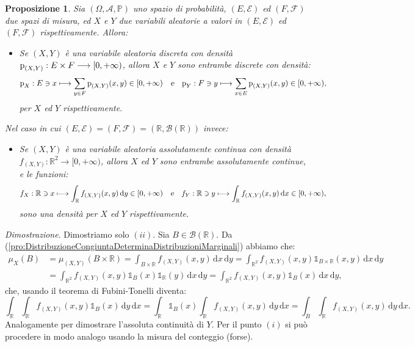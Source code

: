 \documentclass[11pt]{book}
\makeatletter
\theoremstyle{Definizione}
\theoremstyle{TeoremaProposizioneLemmaCorollario}
\newtheorem{mypropo}[myteo]{Proposizione}
\theoremstyle{OsservazioneNota}
\renewenvironment{proof}[1][\proofname]{\par
  \normalfont \topsep6\p@\@plus6\p@\relax
  \trivlist
  \item[\hskip\labelsep
        \itshape
    #1\@addpunct{.}]\ignorespaces
}{%
  \endtrivlist\@endpefalse
}
\newcommand{\R}{\mathbb{R}}
\renewcommand{\P}{\mathbb{P}}
\renewcommand{\d}{\mathrm{d}}
\newcommand{\dx}{\,\d x}
\newcommand{\dy}{\,\d y}
\newcommand{\p}{\textup{p}}
\newcommand{\uno}[1]{\mathds{1}_{#1}}
\renewenvironment{proof}{\textsl{Dimostrazione}.}{}
\makeatother
\begin{document}
\begin{boxpro}
\begin{mypropo}\label{pro:DistribuzioneCongiuntaAssContODiscrAlloraDistribuzioniMarginaliAssContODiscr}
Sia $(\Omega,\mathcal{A},\P)$ uno spazio di probabilità, $(E,\mathcal{E})$ ed $(F,\mathcal{F})$ due spazi di misura, ed $X$ e $Y$ due variabili aleatorie a valori in $(E,\mathcal{E})$ ed $(F,\mathcal{F})$ rispettivamente. Allora:
\begin{itemize}
\item[$(i)$] Se $(X,Y)$ è una variabile aleatoria discreta con densità $\p_{(X,Y)}:E\times F \longrightarrow [0,+\infty)$, allora $X$ e $Y$ sono entrambe discrete con densità:
$$
\p_X:E \ni x \longmapsto \sum_{y\in F} \p_{(X,Y)}(x,y)\in [0,+\infty)\quad \textsl{e}\quad \p_Y:F\ni y \longmapsto \sum_{x\in E} \p_{(X,Y)}(x,y)\in [0,+\infty),
$$
per $X$ ed $Y$ rispettivamente.
\end{itemize}
Nel caso in cui $(E,\mathcal{E}) = (F,\mathcal{F}) = (\R,\mathcal{B}(\R))$ invece:
\begin{itemize}
\item[$(ii)$] Se $(X,Y)$ è una variabile aleatoria assolutamente continua con densità $f_{(X,Y)}:\R^2 \longrightarrow [0,+\infty)$, allora $X$ ed $Y$ sono entrambe assolutamente continue, e le funzioni:
$$
f_X:\R\ni x \longmapsto \int_\R f_{(X,Y)}(x,y)\dy\in [0,+\infty)\quad \textsl{e}\quad f_Y:\R\ni y \longmapsto \int_\R f_{(X,Y)} (x,y)\dx \in [0,+\infty),
$$
sono una densità per $X$ ed $Y$ rispettivamente.
\end{itemize}
\end{mypropo}
\tcblower
\begin{proof}
Dimostriamo solo $(ii)$. Sia $B\in \mathcal{B}(\R)$. Da (\ref{pro:DistribuzioneCongiuntaDeterminaDistribuzioniMarginali}) abbiamo che:
\begin{align*}
\mu_X(B) &= \mu_{(X,Y)}(B\times \R) = \int_{B\times \R}f_{(X,Y)}(x,y)\dx\dy = \int_{\R^2} f_{(X,Y)}(x,y)\uno{B\times \R}(x,y) \dx\dy \\
&= \int_{\R^2} f_{(X,Y)}(x,y) \uno{B}(x)\uno{\R}(y) \dx\dy = \int_{\R^2} f_{(X,Y)}(x,y)\uno{B}(x)\dx\dy,
\end{align*}
che, usando il teorema di Fubini-Tonelli diventa:
$$
\int_\R\int_\R f_{(X,Y)}(x,y)\uno{B}(x)\dy\dx = \int_\R \uno{B}(x)\int_\R f_{(X,Y)}(x,y)\dy\dx = \int_B \int_\R f_{(X,Y)}(x,y)\dy\dx.
$$
Analogamente per dimostrare l'assoluta continuità di $Y$. Per il punto $(i)$ si può procedere in modo analogo usando la misura del conteggio (forse).
\end{proof}
\end{boxpro}
\end{document}
